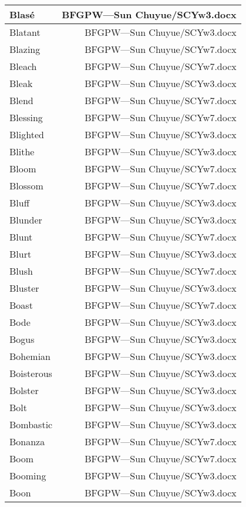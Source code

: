 \documentclass{article}
\begin{document}
\begin{center}
\begin{longtable}{|l|r|}
\hline
Blasé  &  BFGPW---Sun Chuyue/SCYw3.docx\\  
\hline
Blatant  &  BFGPW---Sun Chuyue/SCYw3.docx\\  
\hline
Blazing  &  BFGPW---Sun Chuyue/SCYw7.docx\\  
\hline
Bleach  &  BFGPW---Sun Chuyue/SCYw7.docx\\  
\hline
Bleak  &  BFGPW---Sun Chuyue/SCYw3.docx\\  
\hline
Blend  &  BFGPW---Sun Chuyue/SCYw7.docx\\  
\hline
Blessing  &  BFGPW---Sun Chuyue/SCYw7.docx\\  
\hline
Blighted  &  BFGPW---Sun Chuyue/SCYw3.docx\\  
\hline
Blithe  &  BFGPW---Sun Chuyue/SCYw3.docx\\  
\hline
Bloom  &  BFGPW---Sun Chuyue/SCYw7.docx\\  
\hline
Blossom  &  BFGPW---Sun Chuyue/SCYw7.docx\\  
\hline
Bluff  &  BFGPW---Sun Chuyue/SCYw3.docx\\  
\hline
Blunder  &  BFGPW---Sun Chuyue/SCYw3.docx\\  
\hline
Blunt  &  BFGPW---Sun Chuyue/SCYw7.docx\\  
\hline
Blurt  &  BFGPW---Sun Chuyue/SCYw3.docx\\  
\hline
Blush  &  BFGPW---Sun Chuyue/SCYw7.docx\\  
\hline
Bluster  &  BFGPW---Sun Chuyue/SCYw3.docx\\  
\hline
Boast  &  BFGPW---Sun Chuyue/SCYw7.docx\\  
\hline
Bode  &  BFGPW---Sun Chuyue/SCYw3.docx\\  
\hline
Bogus  &  BFGPW---Sun Chuyue/SCYw3.docx\\  
\hline
Bohemian  &  BFGPW---Sun Chuyue/SCYw3.docx\\  
\hline
Boisterous  &  BFGPW---Sun Chuyue/SCYw3.docx\\  
\hline
Bolster  &  BFGPW---Sun Chuyue/SCYw3.docx\\  
\hline
Bolt  &  BFGPW---Sun Chuyue/SCYw3.docx\\  
\hline
Bombastic  &  BFGPW---Sun Chuyue/SCYw3.docx\\  
\hline
Bonanza  &  BFGPW---Sun Chuyue/SCYw7.docx\\  
\hline
Boom  &  BFGPW---Sun Chuyue/SCYw7.docx\\  
\hline
Booming  &  BFGPW---Sun Chuyue/SCYw3.docx\\  
\hline
Boon  &  BFGPW---Sun Chuyue/SCYw3.docx\\  

\end{longtable}
\end{center}
\end{document}
